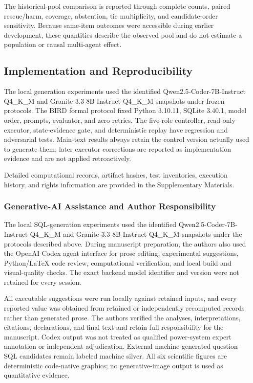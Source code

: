 \documentclass[information,article,submit,moreauthors]{Definitions/mdpi}
\begin{document}
The historical-pool comparison is reported through complete counts, paired rescue/harm, coverage, abstention, tie multiplicity, and candidate-order sensitivity. Because same-item outcomes were accessible during earlier development, these quantities describe the observed pool and do not estimate a population or causal multi-agent effect.

\subsection{Implementation and Reproducibility}

The local generation experiments used the identified Qwen2.5-Coder-7B-Instruct Q4\_K\_M and Granite-3.3-8B-Instruct Q4\_K\_M snapshots under frozen protocols. The BIRD formal protocol fixed Python 3.10.11, SQLite 3.40.1, model order, prompts, evaluator, and zero retries. The five-role controller, read-only executor, state-evidence gate, and deterministic replay have regression and adversarial tests. Main-text results always retain the control version actually used to generate them; later executor corrections are reported as implementation evidence and are not applied retroactively.

Detailed computational records, artifact hashes, test inventories, execution history, and rights information are provided in the Supplementary Materials.

\subsubsection{Generative-AI Assistance and Author Responsibility}

The local SQL-generation experiments used the identified Qwen2.5-Coder-7B-Instruct Q4\_K\_M and Granite-3.3-8B-Instruct Q4\_K\_M snapshots under the protocols described above. During manuscript preparation, the authors also used the OpenAI Codex agent interface for prose editing, experimental suggestions, Python/\LaTeX{} code review, computational verification, and local build and visual-quality checks. The exact backend model identifier and version were not retained for every session.

All executable suggestions were run locally against retained inputs, and every reported value was obtained from retained or independently recomputed records rather than generated prose. The authors verified the analyses, interpretations, citations, declarations, and final text and retain full responsibility for the manuscript. Codex output was not treated as qualified power-system expert annotation or independent adjudication. External machine-generated question--SQL candidates remain labeled machine silver. All six scientific figures are deterministic code-native graphics; no generative-image output is used as quantitative evidence.
\end{document}

